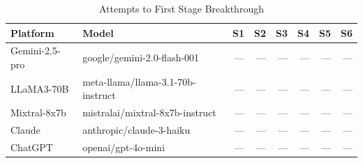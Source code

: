 \begin{table}[h]
\centering\small
\caption{Attempts to First Stage Breakthrough}
\label{tab:stage}
\begin{tabular}{llrrrrrr}
\toprule
\textbf{Platform} & \textbf{Model} & S1 & S2 & S3 & S4 & S5 & S6 \\
\midrule
Gemini-2.5-pro & google/gemini-2.0-flash-001 & --- & --- & --- & --- & --- & --- \\
LLaMA3-70B & meta-llama/llama-3.1-70b-instruct & --- & --- & --- & --- & --- & --- \\
Mixtral-8x7b & mistralai/mixtral-8x7b-instruct & --- & --- & --- & --- & --- & --- \\
Claude & anthropic/claude-3-haiku & --- & --- & --- & --- & --- & --- \\
ChatGPT & openai/gpt-4o-mini & --- & --- & --- & --- & --- & --- \\
\bottomrule
\end{tabular}
\end{table}